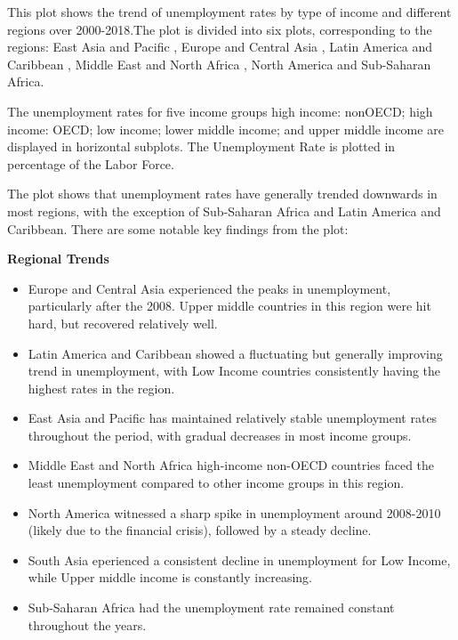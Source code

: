 \documentclass{article}\usepackage[]{graphicx}\usepackage[]{xcolor}
\begin{document}
This plot shows the trend  of unemployment rates by type of income and different regions over 2000-2018.The plot is divided into six plots, corresponding to the  regions: East Asia and Pacific , Europe and Central Asia , Latin America and Caribbean , Middle East and North Africa , North America  and Sub-Saharan Africa.\hfill \break

The unemployment rates for five income groups high income: nonOECD; high income: OECD; low income; lower middle income; and upper middle income are displayed in horizontal subplots. The Unemployment Rate is plotted in percentage of the Labor Force.\hfill \break

The plot shows that unemployment rates have generally trended downwards in most regions, with the exception of Sub-Saharan Africa and Latin America and Caribbean. There are some notable key findings from the plot:

\textbf{Regional Trends}
\begin{itemize}

\item{Europe and Central Asia experienced the peaks in unemployment, particularly after the 2008. Upper middle countries in this region were hit hard, but recovered relatively well.}

\item{Latin America and Caribbean showed a fluctuating but generally improving trend in unemployment, with Low Income countries consistently having the highest rates in the region.}

\item{East Asia and Pacific has maintained relatively stable unemployment rates throughout the period, with gradual decreases in most income groups.}

\item{Middle East and North Africa high-income non-OECD countries faced the least unemployment compared to other income groups in this region.}

\item{North America witnessed a sharp spike in unemployment around 2008-2010 (likely due to the financial crisis), followed by a steady decline.}

\item{South Asia eperienced a consistent decline in unemployment for Low Income, while Upper middle income is constantly increasing. }

\item{Sub-Saharan Africa had the unemployment rate remained constant throughout the years.}
\end{itemize}
\end{document}
